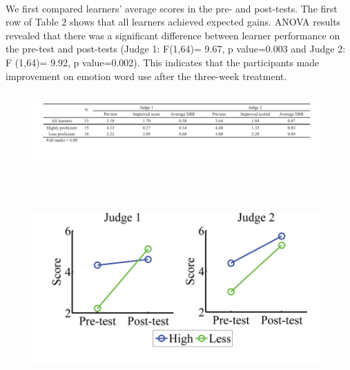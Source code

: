 \documentclass[a4paper,12pt,oneside]{article}
\begin{document}
\paragraph{}
We first compared learners’ average scores in the pre- and post-tests. The first row of Table 2 shows that all learners achieved expected gains. ANOVA results revealed that there was a significant difference between learner performance on the pre-test and post-tests (Judge 1: F(1,64)= 9.67, p value=0.003 and Judge 2: F (1,64)= 9.92, p value=0.002). This indicates that the participants made improvement on emotion word use after the three-week treatment. 

\begin{figure}[H]
\includegraphics[height=3cm,width=15cm]{Table2.png}
\centering
\end{figure}

\begin{figure}[H]
\includegraphics[height=8cm,width=16cm]{Figure3.png}
\centering
\end{figure}
\end{document}
